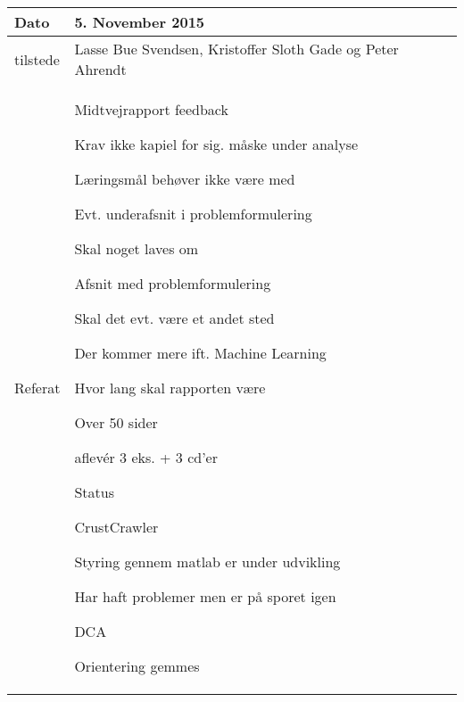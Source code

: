 \begin{center}
	\begin{tabular}{| l | p{10cm} |}
		\hline
		Dato		& 5. November 2015\\ \hline
		tilstede 	& Lasse Bue Svendsen, Kristoffer Sloth Gade og Peter Ahrendt\\ \hline
		Referat		& \vspace{-5mm}\begin{myEnumerate}
			\item Midtvejrapport feedback
			\begin{myItemize}				
				\item Krav ikke kapiel for sig. måske under analyse
				\item Læringsmål behøver ikke være med
				\begin{myItemize}
					\item Evt. underafsnit i problemformulering
				\end{myItemize}
				\item Skal noget laves om
				\begin{myItemize}
					\item Afsnit med problemformulering
					\begin{myItemize}
						\item Skal det evt. være et andet sted
					\end{myItemize}
					\item Der kommer mere ift. Machine Learning
				\end{myItemize}
				\item Hvor lang skal rapporten være
				\begin{myItemize}
					\item Over 50 sider
					\item aflevér 3 eks. + 3 cd'er
				\end{myItemize}
			\end{myItemize}
			\item Status
			\begin{myItemize}
				\item CrustCrawler
				\begin{myItemize}
					\item Styring gennem matlab er under udvikling
					\item Har haft problemer men er på sporet igen
				\end{myItemize}
				\item DCA
				\begin{myItemize}
					\item Orientering gemmes

\end{myItemize}
\end{myItemize}
\end{myEnumerate}
\end{tabular}
\end{center}
